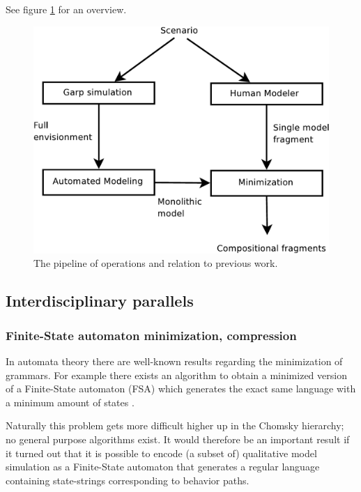 \documentclass{article} %
\begin{document}
See figure \ref{pipeline} for an overview. %

\begin{figure}[ht]
\centering
\includegraphics[scale=0.5]{pipeline-crop.pdf}
\caption{The pipeline of operations and relation to previous work.}
\label{pipeline}
\end{figure}

\subsection{Interdisciplinary parallels}


\subsubsection{Finite-State automaton minimization, compression}

	In automata theory there are well-known results regarding the
	minimization of grammars. For example there exists an algorithm to
	obtain a minimized version of a Finite-State automaton (FSA) which
	generates the exact same language with a minimum amount of states
	\cite{hopcroft}.

	Naturally this problem gets more difficult higher up in the Chomsky
	hierarchy; no general purpose algorithms exist.  It would therefore be
	an important result if it turned out that it is possible to encode (a
	subset of) qualitative model simulation as a Finite-State automaton
	that generates a regular language containing state-strings
	corresponding to behavior paths.
\end{document}
